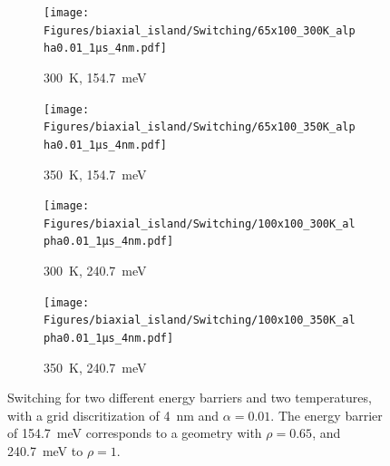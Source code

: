 \documentclass[11pt,a4paper,english]{article}
\begin{document}
\begin{figure}
     \centering
     \begin{subfigure}[b]{0.49\textwidth}
         \centering
         \texttt{[image: Figures/biaxial\_island/Switching/65x100\_300K\_alpha0.01\_1µs\_4nm.pdf]}
         \caption{\SI{300}{\kelvin}, \SI{154.7}{\milli\electronvolt}}
         \label{fig:switching-temp-300-65x100}
     \end{subfigure}
     \hfill
     \begin{subfigure}[b]{0.49\textwidth}
         \centering
         \texttt{[image: Figures/biaxial\_island/Switching/65x100\_350K\_alpha0.01\_1µs\_4nm.pdf]}
         \caption{\SI{350}{\kelvin}, \SI{154.7}{\milli\electronvolt}}
         \label{fig:switching-temp-350-65x100}
     \end{subfigure}
     \begin{subfigure}[b]{0.49\textwidth}
         \centering
         \texttt{[image: Figures/biaxial\_island/Switching/100x100\_300K\_alpha0.01\_1µs\_4nm.pdf]}
         \caption{\SI{300}{\kelvin}, \SI{240.7}{\milli\electronvolt}}
         \label{fig:switching-temp-300-100x100}
     \end{subfigure}
     \hfill
     \begin{subfigure}[b]{0.49\textwidth}
         \centering
         \texttt{[image: Figures/biaxial\_island/Switching/100x100\_350K\_alpha0.01\_1µs\_4nm.pdf]}
         \caption{\SI{350}{\kelvin}, \SI{240.7}{\milli\electronvolt}}
         \label{fig:switching-temp-350-100x100}
     \end{subfigure}
    \caption{Switching for two different energy barriers and two temperatures, with a grid discritization of \SI{4}{\nano\metre} and $\alpha = 0.01$. The energy barrier of \SI{154.7}{\milli\electronvolt} corresponds to a geometry with $\rho=0.65$, and \SI{240.7}{\milli\electronvolt} to $\rho=1$.}
    \label{fig:switching-temp}
\end{figure}
\end{document}
